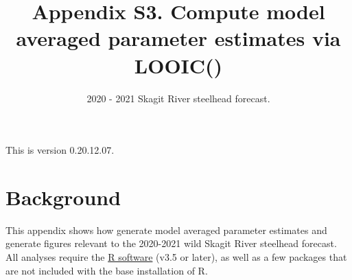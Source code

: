 \documentclass[
  11pt,
]{article}
\title{Appendix S3. Compute model averaged parameter estimates via LOOIC()}
\subtitle{2020 - 2021 Skagit River steelhead forecast.}
\author{}
\date{\vspace{-2.5em}}
\begin{document}
\maketitle

{
\setcounter{tocdepth}{3}
\tableofcontents
}
\vspace{0.2in}

This is version 0.20.12.07.

\hypertarget{background}{%
\section{Background}\label{background}}

This appendix shows how generate model averaged parameter estimates and
generate figures relevant to the 2020-2021 wild Skagit River steelhead
forecast. All analyses require the \href{https://cran.r-project.org/}{R
software} (v3.5 or later), as well as a few packages that are not
included with the base installation of R.
\end{document}
